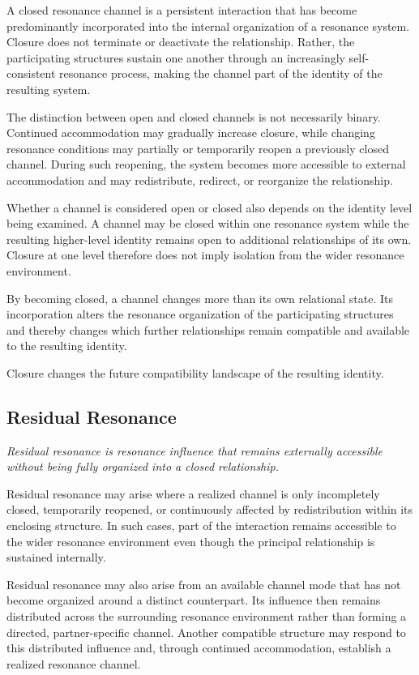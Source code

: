 \documentclass[11pt,a4paper]{article}
\begin{document}
A closed resonance channel is a persistent interaction that has become predominantly incorporated into the internal organization of a resonance system. Closure does not terminate or deactivate the relationship. Rather, the participating structures sustain one another through an increasingly self-consistent resonance process, making the channel part of the identity of the resulting system.

The distinction between open and closed channels is not necessarily binary. Continued accommodation may gradually increase closure, while changing resonance conditions may partially or temporarily reopen a previously closed channel. During such reopening, the system becomes more accessible to external accommodation and may redistribute, redirect, or reorganize the relationship.

Whether a channel is considered open or closed also depends on the identity level being examined. A channel may be closed within one resonance system while the resulting higher-level identity remains open to additional relationships of its own. Closure at one level therefore does not imply isolation from the wider resonance environment.

By becoming closed, a channel changes more than its own relational state. Its incorporation alters the resonance organization of the participating structures and thereby changes which further relationships remain compatible and available to the resulting identity.

Closure changes the future compatibility landscape of the resulting identity.


\subsection{Residual Resonance}

\emph{Residual resonance is resonance influence that remains externally accessible without being fully organized into a closed relationship.}
\vspace{0.6em} 

Residual resonance may arise where a realized channel is only incompletely closed, temporarily reopened, or continuously affected by redistribution within its enclosing structure. In such cases, part of the interaction remains accessible to the wider resonance environment even though the principal relationship is sustained internally.

Residual resonance may also arise from an available channel mode that has not become organized around a distinct counterpart. Its influence then remains distributed across the surrounding resonance environment rather than forming a directed, partner-specific channel. Another compatible structure may respond to this distributed influence and, through continued accommodation, establish a realized resonance channel.
\end{document}
